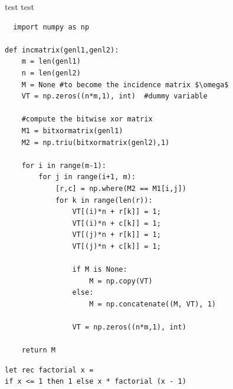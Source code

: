 \documentclass{article}
\begin{document}
\noindent test test
\renewcommand{\theFancyVerbLine}{\ttfamily\scriptsize\arabic{FancyVerbLine}}
\begin{verbatim}
  import numpy as np
    
def incmatrix(genl1,genl2):
    m = len(genl1)
    n = len(genl2)
    M = None #to become the incidence matrix $\omega$
    VT = np.zeros((n*m,1), int)  #dummy variable
    
    #compute the bitwise xor matrix
    M1 = bitxormatrix(genl1)
    M2 = np.triu(bitxormatrix(genl2),1) 

    for i in range(m-1):
        for j in range(i+1, m):
            [r,c] = np.where(M2 == M1[i,j])
            for k in range(len(r)):
                VT[(i)*n + r[k]] = 1;
                VT[(i)*n + c[k]] = 1;
                VT[(j)*n + r[k]] = 1;
                VT[(j)*n + c[k]] = 1;
                
                if M is None:
                    M = np.copy(VT)
                else:
                    M = np.concatenate((M, VT), 1)
                
                VT = np.zeros((n*m,1), int)
    
    return M
\end{verbatim}
\begin{verbatim}
let rec factorial x =
if x <= 1 then 1 else x * factorial (x - 1)
\end{verbatim}
\end{document}
